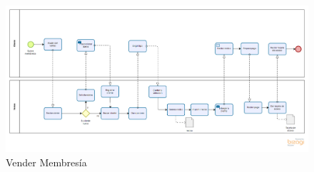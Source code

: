 \begin{figure}[htbp]
	\begin{center}
		\includegraphics[width=1.1\textwidth]{images/Procesos/VenderMembresia}
		\caption{Vender Membresía}
	\end{center}
\end{figure}








